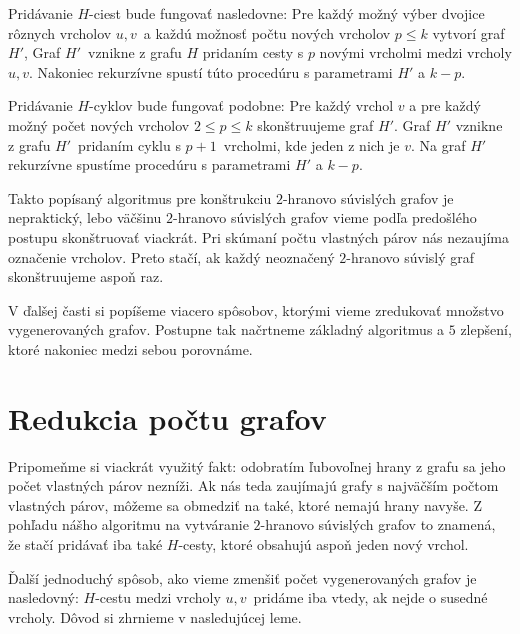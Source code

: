 Pridávanie $H$-ciest bude fungovať nasledovne: Pre každý možný výber dvojice rôznych
vrcholov $u, v$ a každú možnosť počtu nových vrcholov $p \leq k$ vytvorí graf $H'$,
Graf $H'$ vznikne z grafu $H$ pridaním cesty s $p$ novými vrcholmi medzi vrcholy $u, v$.
Nakoniec rekurzívne spustí túto procedúru s parametrami $H'$ a $k - p$.

Pridávanie $H$-cyklov bude fungovať podobne: Pre každý vrchol $v$ a pre každý možný
počet nových vrcholov $2 \leq p \leq k$ skonštruujeme graf $H'$. Graf $H'$ vznikne z
grafu $H'$ pridaním cyklu s $p+1$ vrcholmi, kde jeden z nich je $v$. Na graf $H'$
rekurzívne spustíme procedúru s parametrami $H'$ a $k - p$.

Takto popísaný algoritmus pre konštrukciu $2$-hranovo súvislých grafov je nepraktický,
lebo väčšinu $2$-hranovo súvislých grafov vieme podľa predošlého postupu skonštruovať
viackrát. Pri skúmaní počtu vlastných párov nás nezaujíma označenie vrcholov. Preto stačí,
ak každý neoznačený $2$-hranovo súvislý graf skonštruujeme aspoň raz.

V ďalšej časti si popíšeme viacero spôsobov, ktorými vieme zredukovať množstvo vygenerovaných
grafov. Postupne tak načrtneme základný algoritmus a $5$ zlepšení, ktoré nakoniec medzi
sebou porovnáme.

\section{Redukcia počtu grafov}

Pripomeňme si viackrát využitý fakt: odobratím ľubovoľnej hrany z grafu sa jeho počet vlastných
párov nezníži. Ak nás teda zaujímajú grafy s najväčším počtom vlastných párov, môžeme sa obmedziť
na také, ktoré nemajú hrany navyše. Z pohľadu nášho algoritmu na vytváranie $2$-hranovo súvislých
grafov to znamená, že stačí pridávať iba také $H$-cesty, ktoré obsahujú aspoň jeden nový vrchol.

Ďalší jednoduchý spôsob, ako vieme zmenšiť počet vygenerovaných grafov je nasledovný: $H$-cestu
medzi vrcholy $u, v$ pridáme iba vtedy, ak nejde o susedné vrcholy. Dôvod si zhrnieme v nasledujúcej
leme.

